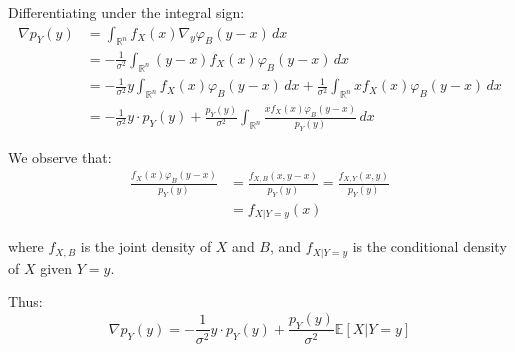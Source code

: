 \documentclass[a4paper,10pt]{article}
\theoremstyle{definition} %
\theoremstyle{definition} %
\theoremstyle{definition} %
\theoremstyle{definition} %
\newcommand{\0}{\boldsymbol{0}}
\begin{document}
Differentiating under the integral sign:
\begin{align*}
\nabla p_Y(y) &= \int_{\mathbb{R}^n} f_X(x) \nabla_y \varphi_B(y - x) \, dx \\
&= -\frac{1}{\sigma^2} \int_{\mathbb{R}^n} (y - x) f_X(x) \varphi_B(y - x) \, dx \\
&= -\frac{1}{\sigma^2} y \int_{\mathbb{R}^n} f_X(x) \varphi_B(y - x) \, dx + \frac{1}{\sigma^2} \int_{\mathbb{R}^n} x f_X(x) \varphi_B(y - x) \, dx \\
&= -\frac{1}{\sigma^2} y \cdot p_Y(y) + \frac{p_Y(y)}{\sigma^2} \int_{\mathbb{R}^n} \frac{x f_X(x) \varphi_B(y - x)}{p_Y(y)} \, dx
\end{align*}

We observe that:
\begin{align*}
\frac{f_X(x) \varphi_B(y - x)}{p_Y(y)} &= \frac{f_{X,B}(x, y - x)}{p_Y(y)} = \frac{f_{X,Y}(x, y)}{p_Y(y)} \\
&= f_{X|Y=y}(x)
\end{align*}

where $f_{X,B}$ is the joint density of $X$ and $B$, and $f_{X|Y=y}$ is the conditional density of $X$ given $Y = y$.

Thus:
\begin{equation*}
\nabla p_Y(y) = -\frac{1}{\sigma^2} y \cdot p_Y(y) + \frac{p_Y(y)}{\sigma^2} \mathbb{E}[X | Y = y]
\end{equation*}
\end{document}
